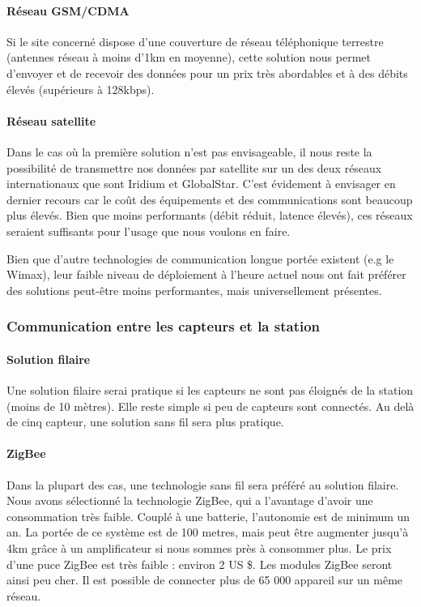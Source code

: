 \paragraph{Réseau GSM/CDMA}

Si le site concerné dispose d’une couverture de réseau téléphonique terrestre (antennes réseau à moins d’1km en moyenne), cette solution nous permet d’envoyer et de recevoir des données pour un prix très abordables et à des débits élevés (supérieurs à 128kbps).

\paragraph{Réseau satellite}

Dans le cas où la première solution n’est pas envisageable, il nous reste la possibilité de transmettre nos données par satellite sur un des deux réseaux internationaux que sont Iridium et GlobalStar. C’est évidement à envisager en dernier recours car le coût des équipements et des communications sont beaucoup plus élevés. Bien que moins performants (débit réduit, latence élevés), ces réseaux seraient suffisants pour l’usage que nous voulons en faire.

Bien que d’autre technologies de communication longue portée existent (e.g le Wimax), leur faible niveau de déploiement à l’heure actuel nous ont fait préférer des solutions peut-être moins performantes, mais universellement présentes.

\subsubsection{Communication entre les capteurs et la station}

\paragraph{Solution filaire}
Une solution filaire serai pratique si les capteurs ne sont pas éloignés de la station (moins de 10 mètres). Elle reste simple si peu de capteurs sont connectés.
Au delà de cinq capteur, une solution sans fil sera plus pratique.\\

\paragraph{ZigBee}

Dans la plupart des cas, une technologie sans fil sera préféré au solution filaire. Nous avons sélectionné la technologie ZigBee, qui a l’avantage d’avoir une consommation très faible. Couplé à une batterie, l’autonomie est de minimum un an. 
La portée de ce système est de 100 metres, mais peut être augmenter jusqu’à 4km grâce à un amplificateur si nous sommes près à consommer plus. Le prix d’une puce ZigBee est très faible : environ 2 US \$. Les modules ZigBee seront ainsi peu cher.
Il est possible de connecter plus de 65 000 appareil sur un même réseau.\\

